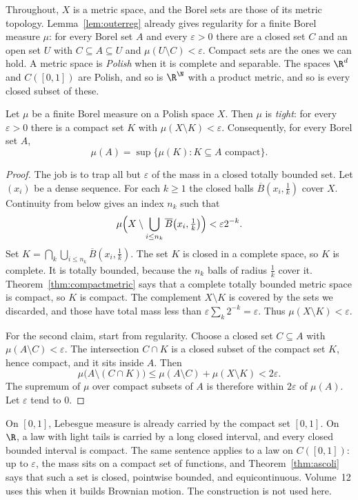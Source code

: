 Throughout, $X$ is a metric space, and the Borel sets are those of its metric topology. Lemma~\ref{lem:outerreg} already gives regularity
for a finite Borel measure $\mu$: for every Borel set $A$ and every $\varepsilon>0$ there are a closed set $C$ and an open set $U$ with
$C\subseteq A\subseteq U$ and $\mu(U\setminus C)<\varepsilon$. Compact sets are the ones we can hold. A metric space is \emph{Polish} when it is
complete and separable. The spaces $\R^d$ and $C([0,1])$ are Polish, and so is $\R^\N$ with a product metric, and so is every closed
subset of these.

\begin{theorem}[Ulam]\label{thm:ulam}
Let $\mu$ be a finite Borel measure on a Polish space $X$. Then $\mu$ is \emph{tight}: for every $\varepsilon>0$ there is a compact set $K$ with
$\mu(X\setminus K)<\varepsilon$. Consequently, for every Borel set $A$,
\[\mu(A)=\sup\{\mu(K):K\subseteq A\text{ compact}\}.\]
\end{theorem}
\begin{proof}
The job is to trap all but $\varepsilon$ of the mass in a closed totally bounded set. Let $(x_i)$ be a dense sequence. For each $k\ge 1$ the closed
balls $\overline B(x_i,\frac1k)$ cover $X$. Continuity from below gives an index $n_k$ such that
\[\mu\Bigl(X\setminus\bigcup_{i\le n_k}\overline B\bigl(x_i,\tfrac1k\bigr)\Bigr)<\varepsilon 2^{-k}.\]
Set $K=\bigcap_k\bigcup_{i\le n_k}\overline B(x_i,\frac1k)$. The set $K$ is closed in a complete space, so $K$ is complete. It is totally bounded,
because the $n_k$ balls of radius $\frac1k$ cover it. Theorem~\ref{thm:compactmetric} says that a complete totally bounded metric space is
compact, so $K$ is compact. The complement $X\setminus K$ is covered by the sets we discarded, and those have total mass less than
$\varepsilon\sum_k 2^{-k}=\varepsilon$. Thus $\mu(X\setminus K)<\varepsilon$.

For the second claim, start from regularity. Choose a closed set $C\subseteq A$ with $\mu(A\setminus C)<\varepsilon$. The intersection $C\cap K$ is a
closed subset of the compact set $K$, hence compact, and it sits inside $A$. Then
\[\mu\bigl(A\setminus(C\cap K)\bigr)\le\mu(A\setminus C)+\mu(X\setminus K)<2\varepsilon.\]
The supremum of $\mu$ over compact subsets of $A$ is therefore within $2\varepsilon$ of $\mu(A)$. Let $\varepsilon$ tend to $0$.
\end{proof}

On $[0,1]$, Lebesgue measure is already carried by the compact set $[0,1]$. On $\R$, a law with light tails is carried by a long closed
interval, and every closed bounded interval is compact. The same sentence applies to a law on $C([0,1])$: up to $\varepsilon$, the mass sits on a
compact set of functions, and Theorem~\ref{thm:ascoli} says that such a set is closed, pointwise bounded, and equicontinuous. Volume~12 uses
this when it builds Brownian motion. The construction is not used here.

